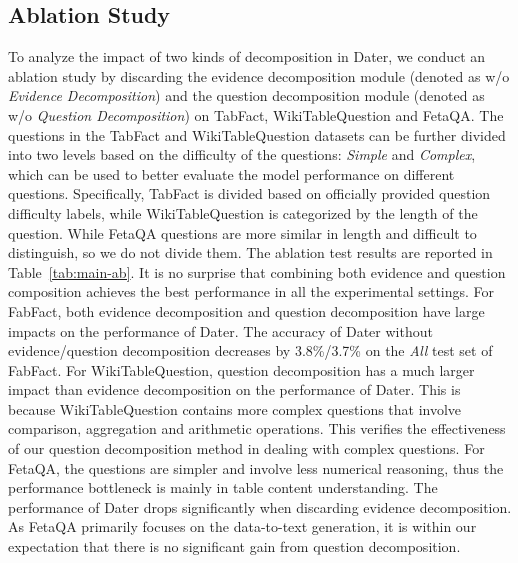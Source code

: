 \subsection{Ablation Study}
To analyze the impact of two kinds of decomposition in Dater, we conduct an ablation study by discarding the evidence decomposition module (denoted as w/o \textit{Evidence Decomposition}) and the question decomposition module (denoted as w/o \textit{Question Decomposition}) on TabFact, WikiTableQuestion and FetaQA. The questions in the TabFact and WikiTableQuestion datasets can be further divided into two levels based on the difficulty of the questions:  \textit{Simple} and \textit{Complex}, which can be used to better evaluate the model performance on different questions. 
Specifically, TabFact is divided based on officially provided question difficulty labels, while WikiTableQuestion is categorized by the length of the question.  
While FetaQA questions are more similar in length and difficult to distinguish, so we do not divide them.
The ablation test results are reported in Table~\ref{tab:main-ab}. 
It is no surprise that combining both evidence and question composition achieves the best performance in all the experimental settings.
For FabFact, both evidence decomposition and question decomposition have large impacts on the performance of Dater. The accuracy of Dater without evidence/question decomposition decreases by 3.8\%/3.7\% on the \textit{All} test set of FabFact. For WikiTableQuestion, question decomposition has a much larger impact than evidence decomposition on the performance of Dater. This is because WikiTableQuestion contains more complex questions that involve comparison, aggregation and arithmetic operations. This verifies the effectiveness of our question decomposition method in dealing with complex questions. 
For FetaQA, the questions are simpler and involve less numerical reasoning, thus the performance bottleneck is mainly in table content understanding. The performance of Dater drops significantly when discarding evidence decomposition. 
As FetaQA primarily focuses on the data-to-text generation, it is within our expectation that there is no significant gain from question decomposition. 

